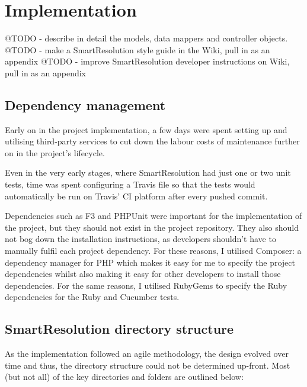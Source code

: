 \chapter{Implementation}

@TODO - describe in detail the models, data mappers and controller objects.
@TODO - make a SmartResolution style guide in the Wiki, pull in as an appendix
@TODO - improve SmartResolution developer instructions on Wiki, pull in as an appendix

\section{Dependency management}

Early on in the project implementation, a few days were spent setting up and utilising third-party services to cut down the labour costs of maintenance further on in the project's lifecycle.

Even in the very early stages, where SmartResolution had just one or two unit tests, time was spent configuring a Travis file so that the tests would automatically be run on Travis' CI platform after every pushed commit.

Dependencies such as F3 and PHPUnit were important for the implementation of the project, but they should not exist in the project repository. They also should not bog down the installation instructions, as developers shouldn't have to manually fulfil each project dependency. For these reasons, I utilised Composer: a dependency manager for PHP which makes it easy for me to specify the project dependencies whilst also making it easy for other developers to install those dependencies. For the same reasons, I utilised RubyGems to specify the Ruby dependencies for the Ruby and Cucumber tests.

\section{SmartResolution directory structure}

As the implementation followed an agile methodology, the design evolved over time and thus, the directory structure could not be determined up-front. Most (but not all) of the key directories and folders are outlined below:

\begin{minipage}{\textwidth}
\end{minipage}

